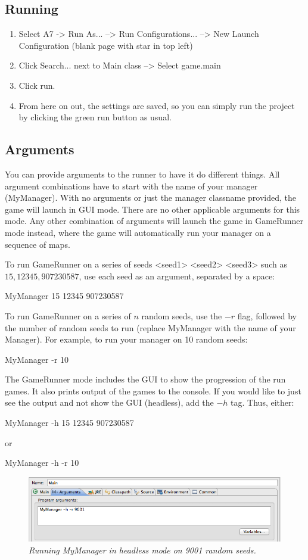 \documentclass[11pt]{article}
\begin{document}
\subsection{Running}
\begin{enumerate}
\item Select A7 -> Run As... --> Run Configurations... --> New Launch Configuration (blank page with star in top left)
\item Click Search... next to Main class --> Select game.main
\item Click run.
\item From here on out, the settings are saved, so you can simply run the project by clicking the green run button as usual.
\end{enumerate}

\subsection{Arguments}
You can provide arguments to the runner to have it do different things. All argument combinations have to start with the name of your manager (MyManager). With no arguments or just the manager classname provided, the game will launch in GUI mode. There are no other applicable arguments for this mode. Any other combination of arguments will launch the game in GameRunner mode instead, where the game will automatically run your manager on a sequence of maps. 

To run GameRunner on a series of seeds <seed1> <seed2> <seed3> such as $15, 12345, 907230587$, use each seed as an argument, separated by a space:
\begin{center}
MyManager 15 12345 907230587
\end{center}
To run GameRunner on a series of $n$ random seeds, use the $-r$ flag, followed by the number of random seeds to run (replace MyManager with the name of your Manager). For example, to run your manager on 10 random seeds:
\begin{center}
MyManager -r 10
\end{center}
The GameRunner mode includes the GUI to show the progression of the run games. It also prints output of the games to the console. If you would like to just see the output and not show the GUI (headless), add the $-h$ tag. Thus, either:
\begin{center}
MyManager -h 15 12345 907230587
\end{center}
or
\begin{center}
MyManager -h -r 10
\end{center}
\begin{figure}[h]
\centerline{\includegraphics[scale=0.55]{args.png}} 
\caption{\em{Running MyManager in headless mode on 9001 random seeds.}}
\end{figure}
\end{document}
